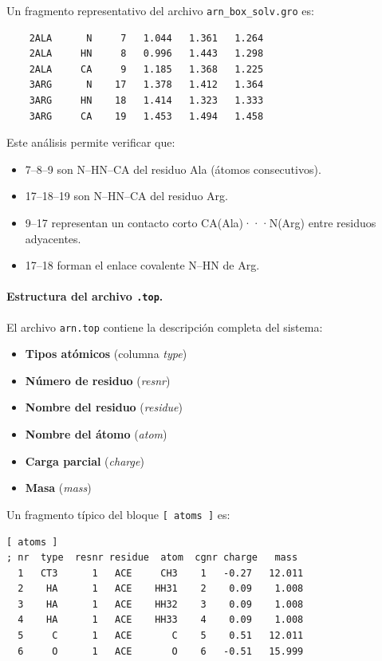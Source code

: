 \documentclass[12pt,a4paper]{article}
\begin{document}
Un fragmento representativo del archivo \texttt{arn\_box\_solv.gro} es:

\begin{verbatim}
    2ALA      N     7   1.044   1.361   1.264
    2ALA     HN     8   0.996   1.443   1.298
    2ALA     CA     9   1.185   1.368   1.225
    3ARG      N    17   1.378   1.412   1.364
    3ARG     HN    18   1.414   1.323   1.333
    3ARG     CA    19   1.453   1.494   1.458
\end{verbatim}

Este análisis permite verificar que:
\begin{itemize}
  \item 7--8--9 son N--HN--CA del residuo Ala (átomos consecutivos).
  \item 17--18--19 son N--HN--CA del residuo Arg.
  \item 9--17 representan un contacto corto CA(Ala)···N(Arg) entre residuos adyacentes.
  \item 17--18 forman el enlace covalente N--HN de Arg.
\end{itemize}

\paragraph{Estructura del archivo \texttt{.top}.}
El archivo \texttt{arn.top} contiene la descripción completa del sistema:

\begin{itemize}
  \item \textbf{Tipos atómicos} (columna \emph{type})
  \item \textbf{Número de residuo} (\emph{resnr})
  \item \textbf{Nombre del residuo} (\emph{residue})
  \item \textbf{Nombre del átomo} (\emph{atom})
  \item \textbf{Carga parcial} (\emph{charge})
  \item \textbf{Masa} (\emph{mass})
\end{itemize}

Un fragmento típico del bloque \texttt{[ atoms ]} es:

\begin{verbatim}
[ atoms ]
; nr  type  resnr residue  atom  cgnr charge   mass
  1   CT3      1   ACE     CH3    1   -0.27   12.011
  2    HA      1   ACE    HH31    2    0.09    1.008
  3    HA      1   ACE    HH32    3    0.09    1.008
  4    HA      1   ACE    HH33    4    0.09    1.008
  5     C      1   ACE       C    5    0.51   12.011
  6     O      1   ACE       O    6   -0.51   15.999
\end{verbatim}
\end{document}
